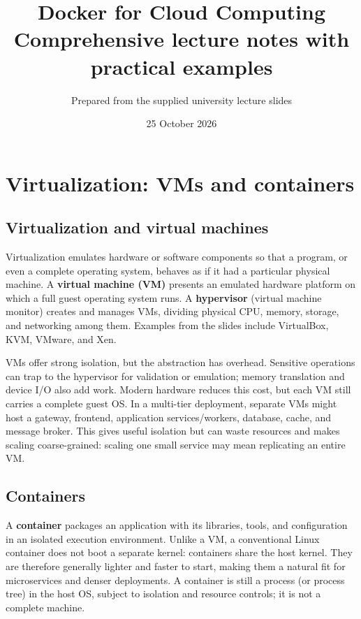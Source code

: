 \documentclass[11pt,a4paper]{article}
\title{Docker for Cloud Computing\\\large Comprehensive lecture notes with practical examples}
\author{Prepared from the supplied university lecture slides}
\date{25 October 2026}
\newcommand{\term}[1]{\textbf{#1}}
\begin{document}
\maketitle

\tableofcontents\newpage

\section{Virtualization: VMs and containers}
\subsection{Virtualization and virtual machines}
Virtualization emulates hardware or software components so that a program, or even a complete operating system, behaves as if it had a particular physical machine. A \term{virtual machine (VM)} presents an emulated hardware platform on which a full guest operating system runs. A \term{hypervisor} (virtual machine monitor) creates and manages VMs, dividing physical CPU, memory, storage, and networking among them. Examples from the slides include VirtualBox, KVM, VMware, and Xen.

VMs offer strong isolation, but the abstraction has overhead. Sensitive operations can trap to the hypervisor for validation or emulation; memory translation and device I/O also add work. Modern hardware reduces this cost, but each VM still carries a complete guest OS. In a multi-tier deployment, separate VMs might host a gateway, frontend, application services/workers, database, cache, and message broker. This gives useful isolation but can waste resources and makes scaling coarse-grained: scaling one small service may mean replicating an entire VM.

\subsection{Containers}
A \term{container} packages an application with its libraries, tools, and configuration in an isolated execution environment. Unlike a VM, a conventional Linux container does not boot a separate kernel: containers share the host kernel. They are therefore generally lighter and faster to start, making them a natural fit for microservices and denser deployments. A container is still a process (or process tree) in the host OS, subject to isolation and resource controls; it is not a complete machine.
\end{document}

